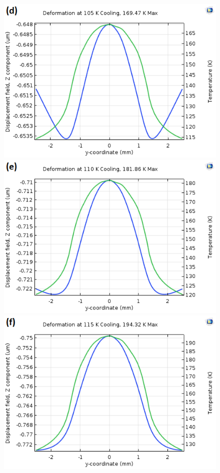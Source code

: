 \documentclass[preprint]{iucr}              %
\begin{document}
\begin{figure}
\includegraphics{images/105.png}
\includegraphics{images/110.png}
\includegraphics{images/115.png}

\label{fig:ydeformation}
\end{figure}
\end{document}
